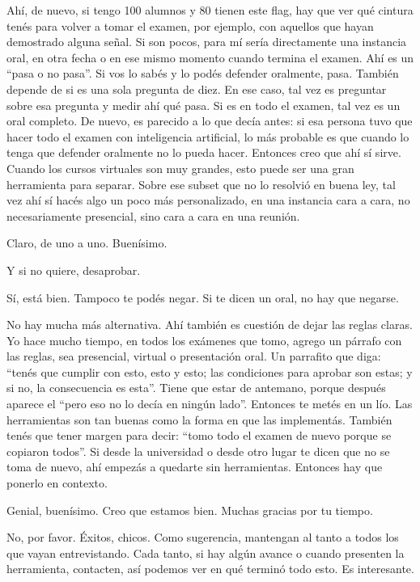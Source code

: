 \begin{description}[leftmargin=0cm, labelsep=0.5cm, style=nextline]
\item[\textbf{Entrevistado:}] Ahí, de nuevo, si tengo 100 alumnos y 80 tienen este flag, hay que ver qué cintura tenés para volver a tomar el examen, por ejemplo, con aquellos que hayan demostrado alguna señal. Si son pocos, para mí sería directamente una instancia oral, en otra fecha o en ese mismo momento cuando termina el examen. Ahí es un ``pasa o no pasa''. Si vos lo sabés y lo podés defender oralmente, pasa. También depende de si es una sola pregunta de diez. En ese caso, tal vez es preguntar sobre esa pregunta y medir ahí qué pasa. Si es en todo el examen, tal vez es un oral completo. De nuevo, es parecido a lo que decía antes: si esa persona tuvo que hacer todo el examen con inteligencia artificial, lo más probable es que cuando lo tenga que defender oralmente no lo pueda hacer. Entonces creo que ahí sí sirve. Cuando los cursos virtuales son muy grandes, esto puede ser una gran herramienta para separar. Sobre ese subset que no lo resolvió en buena ley, tal vez ahí sí hacés algo un poco más personalizado, en una instancia cara a cara, no necesariamente presencial, sino cara a cara en una reunión.
\item[\textbf{Entrevistadores:}] Claro, de uno a uno. Buenísimo.
\item[\textbf{Entrevistado:}] Y si no quiere, desaprobar.
\item[\textbf{Entrevistadores:}] Sí, está bien. Tampoco te podés negar. Si te dicen un oral, no hay que negarse.
\item[\textbf{Entrevistado:}] No hay mucha más alternativa. Ahí también es cuestión de dejar las reglas claras. Yo hace mucho tiempo, en todos los exámenes que tomo, agrego un párrafo con las reglas, sea presencial, virtual o presentación oral. Un parrafito que diga: ``tenés que cumplir con esto, esto y esto; las condiciones para aprobar son estas; y si no, la consecuencia es esta''. Tiene que estar de antemano, porque después aparece el ``pero eso no lo decía en ningún lado''. Entonces te metés en un lío. Las herramientas son tan buenas como la forma en que las implementás. También tenés que tener margen para decir: ``tomo todo el examen de nuevo porque se copiaron todos''. Si desde la universidad o desde otro lugar te dicen que no se toma de nuevo, ahí empezás a quedarte sin herramientas. Entonces hay que ponerlo en contexto.
\item[\textbf{Entrevistadores:}] Genial, buenísimo. Creo que estamos bien. Muchas gracias por tu tiempo.
\item[\textbf{Entrevistado:}] No, por favor. Éxitos, chicos. Como sugerencia, mantengan al tanto a todos los que vayan entrevistando. Cada tanto, si hay algún avance o cuando presenten la herramienta, contacten, así podemos ver en qué terminó todo esto. Es interesante.

\end{description}
